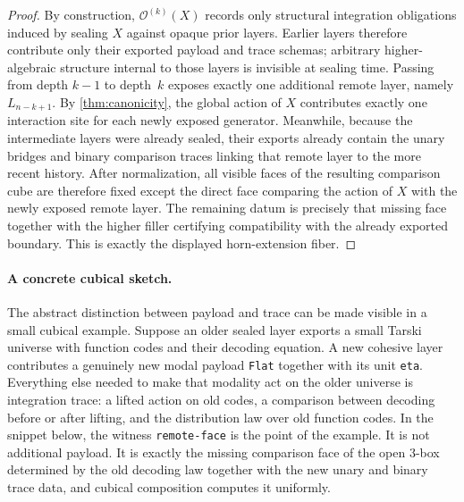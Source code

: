 \documentclass{lmcs}
\newcommand{\Ocal}{\mathcal{O}}
\begin{document}
\begin{proof}
By construction, $\Ocal^{(k)}(X)$ records only structural integration obligations induced by sealing $X$ against opaque prior layers. Earlier layers therefore contribute only their exported payload and trace schemas; arbitrary higher-algebraic structure internal to those layers is invisible at sealing time. Passing from depth $k-1$ to depth~$k$ exposes exactly one additional remote layer, namely $L_{n-k+1}$. By \autoref{thm:canonicity}, the global action of $X$ contributes exactly one interaction site for each newly exposed generator. Meanwhile, because the intermediate layers were already sealed, their exports already contain the unary bridges and binary comparison traces linking that remote layer to the more recent history. After normalization, all visible faces of the resulting comparison cube are therefore fixed except the direct face comparing the action of $X$ with the newly exposed remote layer. The remaining datum is precisely that missing face together with the higher filler certifying compatibility with the already exported boundary. This is exactly the displayed horn-extension fiber.
\end{proof}

\paragraph{A concrete cubical sketch.}
The abstract distinction between payload and trace can be made visible in a small cubical example. Suppose an older sealed layer exports a small Tarski universe with function codes and their decoding equation. A new cohesive layer contributes a genuinely new modal payload \texttt{Flat} together with its unit \texttt{eta}. Everything else needed to make that modality act on the older universe is integration trace: a lifted action on old codes, a comparison between decoding before or after lifting, and the distribution law over old function codes. In the snippet below, the witness \texttt{remote-face} is the point of the example. It is not additional payload. It is exactly the missing comparison face of the open $3$-box determined by the old decoding law together with the new unary and binary trace data, and cubical composition computes it uniformly.
\end{document}
